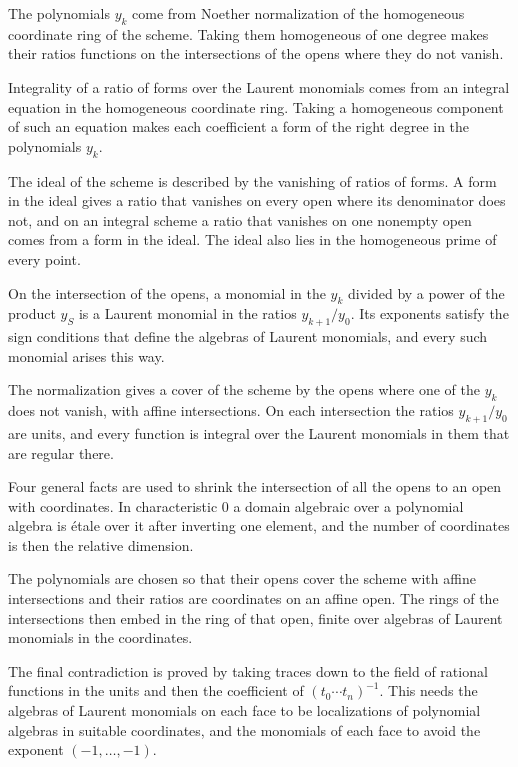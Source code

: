 The polynomials $y_k$ come from Noether normalization of the homogeneous coordinate ring of the scheme. Taking them
homogeneous of one degree makes their ratios functions on the intersections of the opens where they do not vanish.

Integrality of a ratio of forms over the Laurent monomials comes from an integral equation in the homogeneous coordinate
ring. Taking a homogeneous component of such an equation makes each coefficient a form of the right degree in the
polynomials $y_k$.

The ideal of the scheme is described by the vanishing of ratios of forms. A form in the ideal gives a ratio that vanishes
on every open where its denominator does not, and on an integral scheme a ratio that vanishes on one nonempty open comes
from a form in the ideal. The ideal also lies in the homogeneous prime of every point.

On the intersection of the opens, a monomial in the $y_k$ divided by a power of the product $y_S$ is a Laurent monomial in
the ratios $y_{k+1}/y_0$. Its exponents satisfy the sign conditions that define the algebras of Laurent monomials, and
every such monomial arises this way.

The normalization gives a cover of the scheme by the opens where one of the $y_k$ does not vanish, with affine
intersections. On each intersection the ratios $y_{k+1}/y_0$ are units, and every function is integral over the Laurent
monomials in them that are regular there.

Four general facts are used to shrink the intersection of all the opens to an open with coordinates. In characteristic
$0$ a domain algebraic over a polynomial algebra is \'etale over it after inverting one element, and the number of
coordinates is then the relative dimension.

The polynomials are chosen so that their opens cover the scheme with affine intersections and their ratios are
coordinates on an affine open. The rings of the intersections then embed in the ring of that open, finite over algebras
of Laurent monomials in the coordinates.

The final contradiction is proved by taking traces down to the field of rational functions in the units and then the
coefficient of $(t_0\cdots t_n)^{-1}$. This needs the algebras of Laurent monomials on each face to be localizations of
polynomial algebras in suitable coordinates, and the monomials of each face to avoid the exponent $(-1,\ldots,-1)$.


